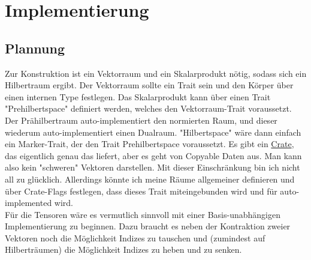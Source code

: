 \documentclass[12pt]{article}
\begin{document}
\section{Implementierung}
\subsection{Plannung}
Zur Konstruktion ist ein Vektorraum und ein Skalarprodukt nötig, sodass sich ein Hilbertraum ergibt. Der Vektorraum sollte ein Trait sein und den Körper über einen internen Type festlegen. Das Skalarprodukt kann über einen Trait "Prehilbertspace" definiert werden, welches den Vektorraum-Trait voraussetzt. Der Prähilbertraum auto-implementiert den normierten Raum, und dieser wiederum auto-implementiert einen Dualraum. "Hilbertspace" wäre dann einfach ein Marker-Trait, der den Trait Prehilbertspace voraussetzt. Es gibt ein \href{https://docs.rs/vector-space/latest/vector_space/index.html}{Crate}, das eigentlich genau das liefert, aber es geht von Copyable Daten aus. Man kann also kein "schweren" Vektoren darstellen. Mit dieser Einschränkung bin ich nicht all zu glücklich. Allerdings könnte ich meine Räume allgemeiner definieren und über Crate-Flags festlegen, dass dieses Trait miteingebunden wird und für auto-implemented wird.\\
Für die Tensoren wäre es vermutlich sinnvoll mit einer Basis-unabhängigen Implementierung zu beginnen. Dazu braucht es neben der Kontraktion zweier Vektoren noch die Möglichkeit Indizes zu tauschen und (zumindest auf Hilberträumen) die Möglichkeit Indizes zu heben und zu senken.



\end{document}
